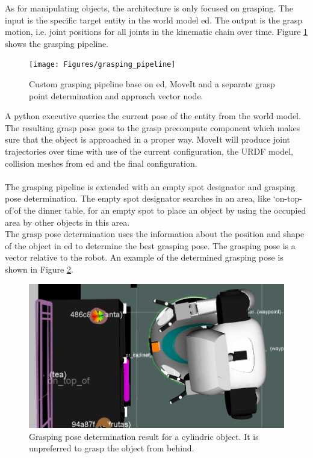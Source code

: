 As for manipulating objects, the architecture is only focused on grasping. The input is the specific target entity in the world model \acrshort{ed}. The output is the grasp motion, i.e. joint positions for all joints in the kinematic chain over time. Figure \ref{fig:grasping_pipeline} shows the grasping pipeline.
\begin{figure}[h]
    \centering
	\texttt{[image: Figures/grasping\_pipeline]}
	\caption{Custom grasping pipeline base on \acrshort{ed}, MoveIt and a separate grasp point determination and approach vector node.}
	\label{fig:grasping_pipeline}
\end{figure}
A python executive queries the current pose of the entity from the world model. The resulting grasp pose goes to the grasp precompute component which makes sure that the object is approached in a proper way. MoveIt will produce joint trajectories over time with use of the current configuration, the URDF model, collision meshes from \acrshort{ed} and the final configuration. %
\\\\
The grasping pipeline is extended with an empty spot designator and grasping pose determination. The empty spot designator searches in an area, like `on-top-of'of the dinner table, for an empty spot to place an object by using the occupied area by other objects in this area.
\\
The grasp pose determination uses the information about the position and shape of the object in \acrshort{ed} to determine the best grasping pose. The grasping pose is a vector relative to the robot. An example of the determined grasping pose is shown in Figure \ref{fig:grasping_pose_determination}.
 \begin{figure}[h]
    \centering
	\includegraphics[width = 0.8\linewidth]{Figures/grasp_point_determination}
	\caption{Grasping pose determination result for a cylindric object. It is unpreferred to grasp the object from behind.}
	\label{fig:grasping_pose_determination}
\end{figure}
